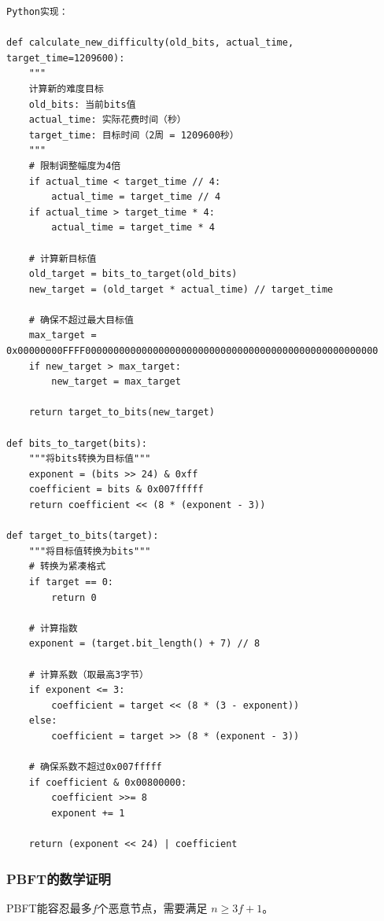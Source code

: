 ﻿\documentclass[12pt,a4paper]{article}
\begin{document}
\begin{lstlisting}
Python实现：

def calculate_new_difficulty(old_bits, actual_time, target_time=1209600):
    """
    计算新的难度目标
    old_bits: 当前bits值
    actual_time: 实际花费时间（秒）
    target_time: 目标时间（2周 = 1209600秒）
    """
    # 限制调整幅度为4倍
    if actual_time < target_time // 4:
        actual_time = target_time // 4
    if actual_time > target_time * 4:
        actual_time = target_time * 4
    
    # 计算新目标值
    old_target = bits_to_target(old_bits)
    new_target = (old_target * actual_time) // target_time
    
    # 确保不超过最大目标值
    max_target = 0x00000000FFFF0000000000000000000000000000000000000000000000000000
    if new_target > max_target:
        new_target = max_target
    
    return target_to_bits(new_target)

def bits_to_target(bits):
    """将bits转换为目标值"""
    exponent = (bits >> 24) & 0xff
    coefficient = bits & 0x007fffff
    return coefficient << (8 * (exponent - 3))

def target_to_bits(target):
    """将目标值转换为bits"""
    # 转换为紧凑格式
    if target == 0:
        return 0
    
    # 计算指数
    exponent = (target.bit_length() + 7) // 8
    
    # 计算系数（取最高3字节）
    if exponent <= 3:
        coefficient = target << (8 * (3 - exponent))
    else:
        coefficient = target >> (8 * (exponent - 3))
    
    # 确保系数不超过0x007fffff
    if coefficient & 0x00800000:
        coefficient >>= 8
        exponent += 1
    
    return (exponent << 24) | coefficient
\end{lstlisting}

\subsubsection{PBFT的数学证明}

PBFT能容忍最多$f$个恶意节点，需要满足 $n \geq 3f + 1$。
\end{document}

